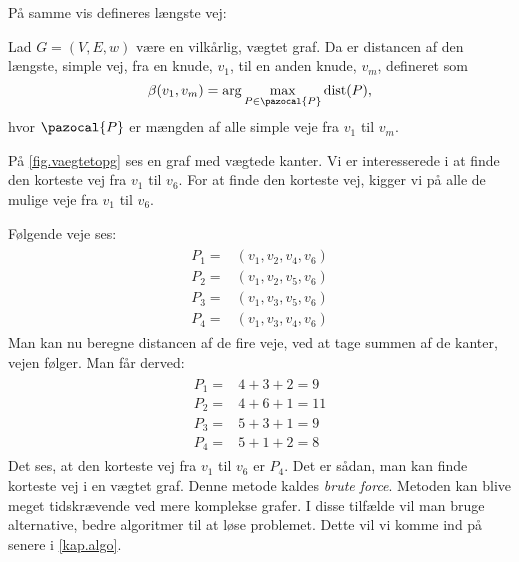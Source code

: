 På samme vis defineres længste vej:

\begin{defn} 
	Lad $G=(V,E,w)$ være en vilkårlig, vægtet graf. Da er distancen af den længste, simple vej, fra en knude, $v_1$, til en anden knude, $v_m$, defineret som
	\begin{equation}
		\beta(v_1,v_m)=\arg \max_{P \in \pazocal{P}}
		\textrm{dist}(P),
	\end{equation}
	hvor $\pazocal{P}$ er mængden af alle simple veje fra $v_1$ til $v_m$.
\end{defn}

\begin{exmp}
På \autoref{fig.vaegtetopg} ses en graf med vægtede kanter. Vi er interesserede i at finde den korteste vej fra $v_1$ til $v_6$. For at finde den korteste vej, kigger vi på alle de mulige veje fra $v_1$ til $v_6$.

Følgende veje ses:
\begin{align}
\begin{split}
	P_1=&(v_1,v_2,v_4,v_6)\\
	P_2=&(v_1,v_2,v_5,v_6)\\
	P_3=&(v_1,v_3,v_5,v_6)\\
	P_4=&(v_1,v_3,v_4,v_6)
\end{split}
\end{align}
Man kan nu beregne distancen af de fire veje, ved at tage summen af de kanter, vejen følger. Man får derved:
\begin{align}
\begin{split}
	P_1=&4+3+2=9\\
	P_2=&4+6+1=11\\
	P_3=&5+3+1=9\\
	P_4=&5+1+2=8
\end{split}
\end{align}
Det ses, at den korteste vej fra $v_1$ til $v_6$ er $P_4$. 
Det er sådan, man kan finde korteste vej i en vægtet graf. Denne metode kaldes \emph{brute force}. Metoden kan blive meget tidskrævende ved mere komplekse grafer. I disse tilfælde vil man bruge alternative, bedre algoritmer til at løse problemet. Dette vil vi komme ind på senere i \autoref{kap.algo}.
\end{exmp}


